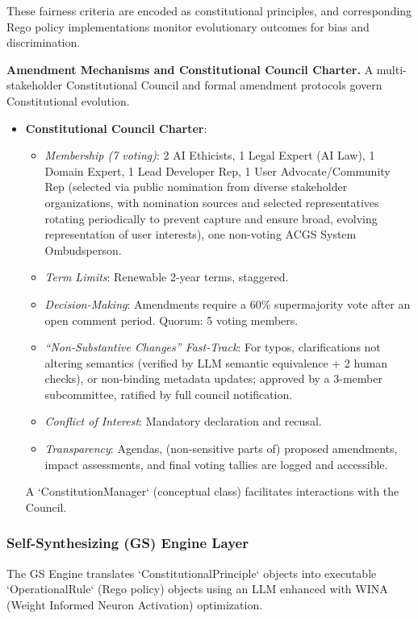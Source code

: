 \documentclass[manuscript,screen,review,anonymous,9pt]{acmart}
\begin{document}
These fairness criteria are encoded as constitutional principles, and corresponding Rego policy implementations monitor evolutionary outcomes for bias and discrimination.

\textbf{Amendment Mechanisms and Constitutional Council Charter.} A multi-stakeholder Constitutional Council and formal amendment protocols govern Constitutional evolution.
\begin{itemize}
	\item \textbf{Constitutional Council Charter}:
	      \begin{itemize}
		      \item \textit{Membership (7 voting)}: 2 AI Ethicists, 1 Legal Expert (AI Law), 1 Domain Expert, 1 Lead Developer Rep, 1 User Advocate/Community Rep (selected via public nomination from diverse stakeholder organizations, with nomination sources and selected representatives rotating periodically to prevent capture and ensure broad, evolving representation of user interests), one non-voting ACGS System Ombudsperson.
		      \item \textit{Term Limits}: Renewable 2-year terms, staggered.
		      \item \textit{Decision-Making}: Amendments require a 60\% supermajority vote after an open comment period. Quorum: 5 voting members.
		      \item \textit{``Non-Substantive Changes'' Fast-Track}: For typos, clarifications not altering semantics (verified by LLM semantic equivalence + 2 human checks), or non-binding metadata updates; approved by a 3-member subcommittee, ratified by full council notification.
		      \item \textit{Conflict of Interest}: Mandatory declaration and recusal.
		      \item \textit{Transparency}: Agendas, (non-sensitive parts of) proposed amendments, impact assessments, and final voting tallies are logged and accessible.
	      \end{itemize}
	      A `ConstitutionManager` (conceptual class) facilitates interactions with the Council.
\end{itemize}

\subsubsection{Self-Synthesizing (GS) Engine Layer}
The GS Engine translates `ConstitutionalPrinciple` objects into executable `OperationalRule` (Rego policy) objects using an LLM enhanced with WINA (Weight Informed Neuron Activation) optimization.
\end{document}
